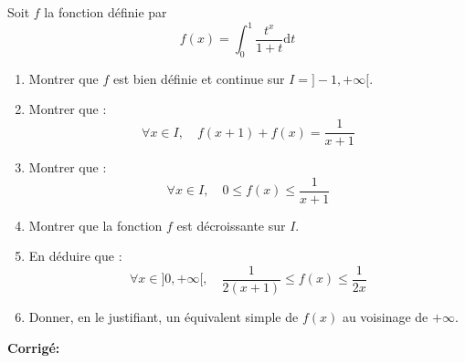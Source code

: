 \documentclass[a4paper,twoside,french,11pt]{VcCours}
\newcommand{\dt}{\text{d}t}
\newcommand{\corr}{\textbf{Corrigé:}}
\begin{document}
\begin{Exercice}{} Soit $f$ la fonction définie par 
$$f(x)=\int_0^1 \frac{t^x}{1+t} \dt$$
	\begin{enumerate}
	\item Montrer que $f$ est bien définie et continue sur $I=]-1, + \infty[$.

	\item Montrer que :
$$\forall x\in I,\quad f(x+1)+f(x)=\frac1{x+1}$$

	\item Montrer que :
$$\forall x\in I,\quad 0\leq f(x) \leq \frac1{x+1}$$

	\item Montrer que la fonction $f$ est décroissante sur $I$.

	\item En déduire que :
$$\forall x\in]0,+\infty[,\quad \frac1{2(x+1)} \leq f(x) \leq \frac1{2x}$$

	\item Donner, en le justifiant, un équivalent simple de $f(x)$ au voisinage de $+\infty$.
	\end{enumerate}
\end{Exercice}

\corr 
\end{document}
